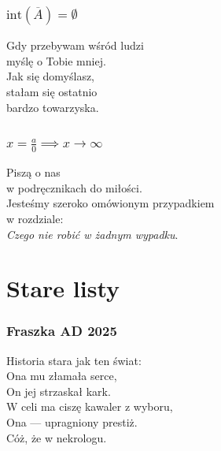\documentclass[12pt, a4paper]{memoir}
\renewenvironment{verse}{%
  \par\vspace{\baselineskip}\raggedright
}{
  \par\vspace{\baselineskip}
}
\begin{document}
\section[Zbiory nigdziegęste]{$\text{int}(\overline{A}) = \emptyset$}

\begin{verse}
Gdy przebywam wśród ludzi\\
myślę o Tobie mniej.\\[\baselineskip]

Jak się domyślasz,\\
stałam się ostatnio \\
bardzo towarzyska.
\end{verse}
\clearpage

\section[Osobliwości]{$x = \frac{a}{0} \implies x \to \infty$}

\begin{verse}
Piszą o nas\\
w podręcznikach do miłości.\\[\baselineskip]

Jesteśmy szeroko omówionym przypadkiem\\
w rozdziale:\\
\textit{Czego nie robić w żadnym wypadku}.
\end{verse}

\clearpage

\part{Stare listy}

\section{Fraszka AD 2025}
\begin{verse}
Historia stara jak ten świat:\\
Ona mu złamała serce,\\
On jej strzaskał kark.\\[\baselineskip]

W celi ma ciszę kawaler z wyboru,\\
Ona --- upragniony prestiż.\\
Cóż, że w nekrologu.
\end{verse}

\clearpage
\end{document}
